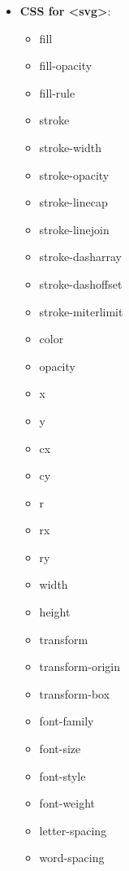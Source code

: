 \documentclass{report}
\begin{document}
\begin{itemize}
\begin{itemize}
                \item Width = 200 units
                \item Height = 100 units
            \end{itemize}
            This allows scaling without distortion.
        \item \textbf{CSS for <svg>}: 
            \begin{itemize}
                \item fill
                \item fill-opacity
                \item fill-rule
                \item stroke
                \item stroke-width
                \item stroke-opacity
                \item stroke-linecap
                \item stroke-linejoin
                \item stroke-dasharray
                \item stroke-dashoffset
                \item stroke-miterlimit
                \item color
                \item opacity
                \item x
                \item y
                \item cx
                \item cy
                \item r
                \item rx
                \item ry
                \item width
                \item height
                \item transform
                \item transform-origin
                \item transform-box
                \item font-family
                \item font-size
                \item font-style
                \item font-weight
                \item letter-spacing
                \item word-spacing

\end{itemize}
\end{itemize}
\end{document}
